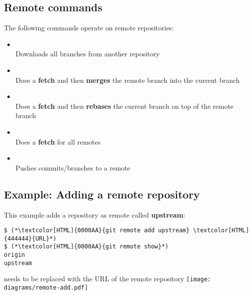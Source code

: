 \subsection{Remote commands}
\begin{frame}[fragile]
  \subslidetitle
  The following commands operate on remote repositories:
  \begin{itemize}
    \item {} \\
      Downloads all branches from another repository
    \item {} \\
      Does a {\bf fetch} and then {\bf merges} the remote branch into the current branch
    \item {} \\
      Does a {\bf fetch} and then {\bf rebases} the current branch on top of the remote branch
    \item {} \\
      Does a {\bf fetch} for all remotes
    \item {} \\
      Pushes commits/branches to a remote
  \end{itemize}
\end{frame}

\subsection{Example: Adding a remote repository}
\begin{frame}[fragile]
  \subslidetitle
  This example adds a repository as remote called \textbf{upstream}:
  \begin{lstlisting}
$ (*\textcolor[HTML]{0000AA}{git remote add upstream} \textcolor[HTML]{444444}{URL}*)
$ (*\textcolor[HTML]{0000AA}{git remote show}*)
origin
upstream
\end{lstlisting}
\vspace{1em}
 needs to be replaced with the URL of the remote repository
\vspace{1em}
\center \texttt{[image: diagrams/remote-add.pdf]}
\end{frame}

